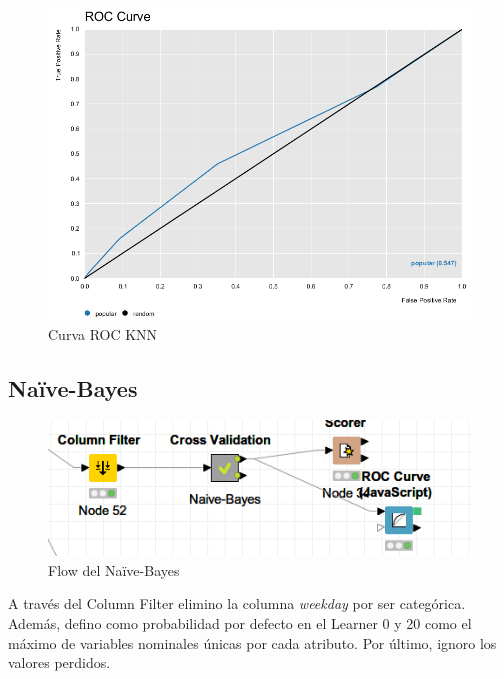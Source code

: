\begin{figure}[H] %
	\centering
	\includegraphics[scale=0.38]{roc-knn-p.png}  %
	\caption{Curva ROC KNN} 
	\label{fig:rocknn-p}
\end{figure}

\subsection{Naïve-Bayes}

\begin{figure}[H] %
	\centering
	\includegraphics[scale=0.4]{flow-nb-p.png}  %
	\caption{Flow del Naïve-Bayes} 
	\label{fig:flow-nb}
\end{figure}

A través del Column Filter elimino la columna \textit{weekday} por ser categórica. Además, defino como probabilidad por defecto en el Learner 0 y 20 como el máximo de variables nominales únicas por cada atributo. Por último, ignoro los valores perdidos.

